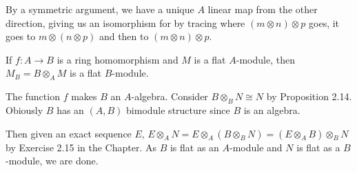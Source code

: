 \documentclass[a4paper]{exam}
\begin{document}
\begin{questions}
\begin{solution}
		By a symmetric argument, we have a unique $A $ linear map from the other direction, giving us an isomorphism for by tracing where $(m \otimes n) \otimes p $ goes, it goes to $m \otimes (n \otimes p) $ and then to $(m \otimes n) \otimes p $.
	\end{solution}

	\question If $f: A\to B $ is a ring homomorphism and $M $ is a flat $A $-module, then $M_B = B \otimes _A M$ is a flat $B $-module.
	\begin{solution}
		The function $f $ makes $B $ an $A $-algebra.
		Consider $B \otimes_B N \cong N $ by Proposition 2.14.
		Obiously $B $ has an $(A,B) $ bimodule structure since $B $ is an algebra.

		Then given an exact sequence $E $, $E \otimes_A N = E \otimes_A (B \otimes_B N) = (E \otimes_A B) \otimes_B N $ by Exercise 2.15 in the Chapter.
		As $B $ is flat as an $A $-module and $N$ is flat as a $B $-module, we are done.
	\end{solution}
\end{questions}
\end{document}

